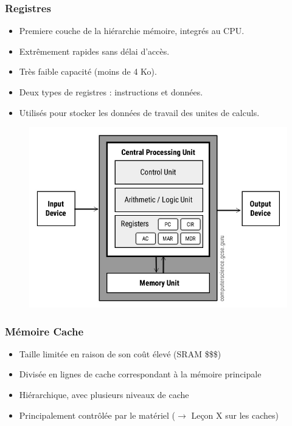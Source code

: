 \documentclass[8pt]{beamer}
\begin{document}
\begin{frame}
    \frametitle{Registres}
    \begin{itemize}
        \item Premiere couche de la hiérarchie mémoire, integr\'es au CPU.
        \item Extrêmement rapides sans délai d'accès.
        \item Très faible capacité (moins de 4 Ko).
        \item Deux types de registres : instructions et données.
        \item Utilisés pour stocker les données de travail des unites de
              calculs.
    \end{itemize}
    \begin{figure}
        \centering

        \includegraphics[width=.45\textwidth]{figures/Von-Neumann-Architecture-Diagram.jpg}
        \label{fig:sub1}
    \end{figure}

\end{frame}
\begin{frame}
    \frametitle{Mémoire Cache}
    \begin{itemize}
        \item Taille limitée en raison de son coût élevé (SRAM \$\$\$)
        \item Divisée en lignes de cache correspondant \`a la m\'emoire
              principale
        \item Hiérarchique, avec plusieurs niveaux de cache
        \item Principalement contrôlée par le matériel ($\to$ Le\c{c}on X sur
              les caches)
    \end{itemize}
\end{frame}
\end{document}
